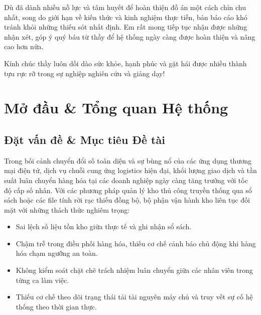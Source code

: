 \documentclass[12pt,a4paper,oneside]{report}
\begin{document}
Dù đã dành nhiều nỗ lực và tâm huyết để hoàn thiện đồ án một cách chỉn chu nhất, song do giới hạn về kiến thức và kinh nghiệm thực tiễn, bản báo cáo khó tránh khỏi những thiếu sót nhất định. Em rất mong tiếp tục nhận được những nhận xét, góp ý quý báu từ thầy để hệ thống ngày càng được hoàn thiện và nâng cao hơn nữa.

Kính chúc thầy luôn dồi dào sức khỏe, hạnh phúc và gặt hái được nhiều thành tựu rực rỡ trong sự nghiệp nghiên cứu và giảng dạy!



\newpage
\tableofcontents

\newpage
\listoffigures
\vspace{15pt}
\listoftables

\newpage
{}
\setcounter{page}{1}

\chapter{Mở đầu \& Tổng quan Hệ thống}

\section{Đặt vấn đề \& Mục tiêu Đề tài}
Trong bối cảnh chuyển đổi số toàn diện và sự bùng nổ của các ứng dụng thương mại điện tử, dịch vụ chuỗi cung ứng logistics hiện đại, khối lượng giao dịch và tần suất luân chuyển hàng hóa tại các doanh nghiệp ngày càng tăng trưởng với tốc độ cấp số nhân. Với các phương pháp quản lý kho thủ công truyền thống qua sổ sách hoặc các file tính rời rạc thiếu đồng bộ, bộ phận vận hành kho liên tục đối mặt với những thách thức nghiêm trọng:
\begin{itemize}
    \item Sai lệch số liệu tồn kho giữa thực tế và ghi nhận sổ sách.
    \item Chậm trễ trong điều phối hàng hóa, thiếu cơ chế cảnh báo chủ động khi hàng hóa chạm ngưỡng an toàn.
    \item Không kiểm soát chặt chẽ trách nhiệm luân chuyển giữa các nhân viên trong từng ca làm việc.
    \item Thiếu cơ chế theo dõi trạng thái tải tài nguyên máy chủ và truy vết sự cố hệ thống theo thời gian thực.
\end{itemize}
\end{document}

